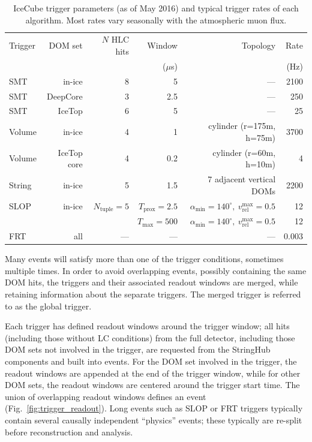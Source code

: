 \begin{table}
  \centering
  \footnotesize
\begin{tabular}{lrrrrr}
  \hline
  Trigger & DOM set & $N$ HLC hits & Window & Topology & Rate\\
  & & & ($\mu$s) &  &  (Hz) \\
  \hline
  SMT & in-ice & 8 & 5 & --- & 2100\\
  SMT & DeepCore & 3 & 2.5 & --- & 250\\
  SMT & IceTop & 6 & 5 & --- & 25\\
  Volume & in-ice & 4 & 1 & cylinder (r=175m, h=75m) & 3700\\
  Volume & IceTop core & 4 & 0.2 & cylinder (r=60m, h=10m) & 4\\  
  String & in-ice & 5 & 1.5 & 7 adjacent vertical DOMs & 2200\\
  SLOP & in-ice & $N_{\mathrm{tuple}} = 5$ & $T_{\mathrm{prox}} = 2.5$ & $\alpha_{\mathrm{min}} =
  140^\circ,\ v_{\mathrm{rel}}^{\mathrm{max}} = 0.5$ & 12\\
   &  &  & $T_{\mathrm{max}} = 500$ & $\alpha_{\mathrm{min}} =
  140^\circ,\ v_{\mathrm{rel}}^{\mathrm{max}} = 0.5$ & 12\\
  FRT & all & --- & --- & --- & 0.003\\
\hline
\end{tabular}
\caption{IceCube trigger parameters (as of May 2016) and typical trigger rates of
  each algorithm.  Most rates vary seasonally with the atmospheric muon flux.} 
\label{tab:triggers}
\end{table}

Many events will satisfy more than one of the trigger conditions,
sometimes multiple times.  In order to
avoid overlapping events, possibly containing the same DOM hits, the
triggers and their associated readout windows are merged, while retaining
information about the separate triggers.  The merged trigger is referred to
as the global trigger.   

Each trigger has defined readout windows around the trigger window;
all hits (including those without LC conditions) from the full detector,
including those DOM sets not involved in the trigger, are requested from
the StringHub components and built into events.  For the DOM set involved
in the trigger, the readout windows are appended at the end of the trigger
window, while for other DOM sets, the readout windows are centered around
the trigger start time.  The union of overlapping readout windows defines
an event (Fig.~\ref{fig:trigger_readout}).  Long events such as SLOP or FRT
triggers typically contain several causally independent ``physics'' events;
these typically are re-split before reconstruction and analysis.

